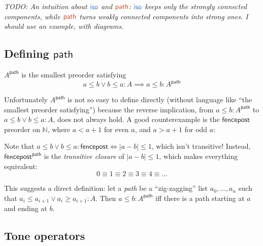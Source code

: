 \documentclass[b5,wide,libertine,ribbons]{rntz}
\newcommand{\todo}[1]{{\itshape\color{blue}#1}}
\newcommand{\ms}[1]{\ensuremath{\mathsf{#1}}}
\newcommand{\N}{\mathbb{N}}
\newcommand{\iso}{\ms{iso}}     %
\renewcommand{\path}{\ms{path}} %
\newcommand{\ti}{{\color{ACMBlue}\iso}} %
\newcommand{\tb}{{\color{ACMRed}\path}} %
\renewcommand{\ti}{{\color{NavyBlue}\iso}}     %
\renewcommand{\tb}{{\color{Bittersweet}\path}} %
\begin{document}
\todo{TODO: An intuition about $\ti$ and $\tb$: $\ti$ keeps only the
  \emph{strongly connected components}, while $\tb$ turns \emph{weakly}
  connected components into \emph{strong} ones. I should use an example, with
  diagrams.}

\subsection{Defining \path{}} \label{sec:defining-path}

$A^\path$ is the smallest preorder satisfying
\[ a \le b \vee b \le a : A \implies a \le b : A^\path \]

Unfortunately $A^\path$ is not so easy to define directly (without
language like ``the smallest preorder satisfying'')
%
because the reverse implication, from $a \le b : A^\path$ to $a \le b \vee b \le
a : A$, does not always hold. A good counterexample is the \ms{fencepost}
preorder on $\N$, where $a < a+1$ for even $a$, and $a > a+1$ for odd $a$:

\begin{center}
\end{center}

Note that $a \le b \vee b \le a : \ms{fencepost} \iff |a-b| \le 1$, which isn't
transitive! Instead, $\ms{fencepost}^\path$ is the \emph{transitive closure} of
$|a-b| \le 1$, which makes everything equivalent:
\[ 0 \equiv 1 \equiv 2 \equiv 3 \equiv 4 \equiv \dots \]

This suggests a direct definition: let a \emph{path} be a ``zig-zagging'' list
$a_0, \dots, a_n$ such that $a_i \le a_{i+1} \vee a_i \ge a_{i+1} : A$. Then $a
\le b : A^\path$ iff there is a path starting at $a$ and ending at $b$.


\subsection{Tone operators}
\end{document}
